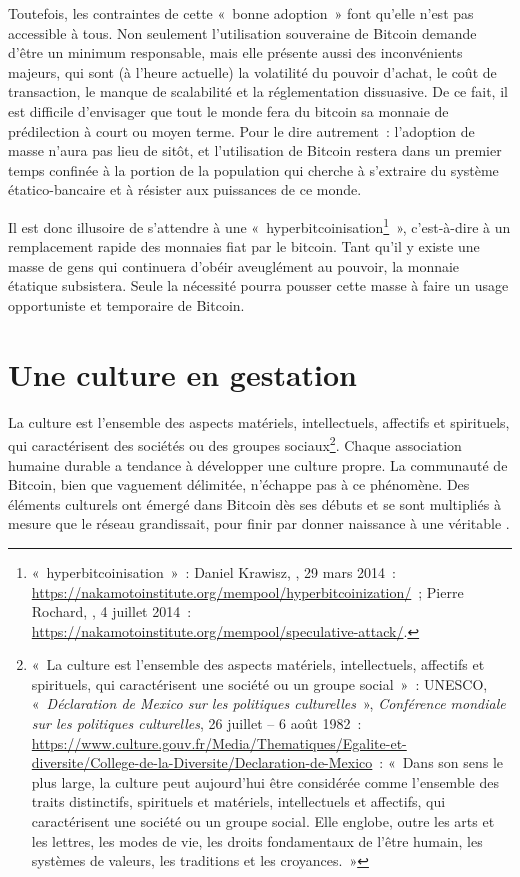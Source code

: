 Toutefois, les contraintes de cette «~bonne adoption~» font qu'elle n'est pas accessible à tous. Non seulement l'utilisation souveraine de Bitcoin demande d'être un minimum responsable, mais elle présente aussi des inconvénients majeurs, qui sont (à l'heure actuelle) la volatilité du pouvoir d'achat, le coût de transaction, le manque de scalabilité et la réglementation dissuasive. De ce fait, il est difficile d'envisager que tout le monde fera du bitcoin sa monnaie de prédilection à court ou moyen terme. Pour le dire autrement~: l'adoption de masse n'aura pas lieu de sitôt, et l'utilisation de Bitcoin restera dans un premier temps confinée à la portion de la population qui cherche à s'extraire du système étatico-bancaire et à résister aux puissances de ce monde.

Il est donc illusoire de s'attendre à une «~hyperbitcoinisation\footnote{«~hyperbitcoinisation~»~: Daniel Krawisz, , 29 mars 2014~: \url{https://nakamotoinstitute.org/mempool/hyperbitcoinization/}~; Pierre Rochard, , 4 juillet 2014~: \url{https://nakamotoinstitute.org/mempool/speculative-attack/}.}~», c'est-à-dire à un remplacement rapide des monnaies fiat par le bitcoin. Tant qu'il y existe une masse de gens qui continuera d'obéir aveuglément au pouvoir, la monnaie étatique subsistera. Seule la nécessité pourra pousser cette masse à faire un usage opportuniste et temporaire de Bitcoin.

\vspace{-1em}
\section*{Une culture en gestation}

La culture est l'ensemble des aspects matériels, intellectuels, affectifs et spirituels, qui caractérisent des sociétés ou des groupes sociaux\footnote{«~La culture est l'ensemble des aspects matériels, intellectuels, affectifs et spirituels, qui caractérisent une société ou un groupe social~»~: UNESCO, «~\emph{Déclaration de Mexico sur les politiques culturelles}~», \emph{Conférence mondiale sur les politiques culturelles}, 26 juillet -- 6 août 1982~: \url{https://www.culture.gouv.fr/Media/Thematiques/Egalite-et-diversite/College-de-la-Diversite/Declaration-de-Mexico}~: «~Dans son sens le plus large, la culture peut aujourd'hui être considérée comme l'ensemble des traits distinctifs, spirituels et matériels, intellectuels et affectifs, qui caractérisent une société ou un groupe social. Elle englobe, outre les arts et les lettres, les modes de vie, les droits fondamentaux de l'être humain, les systèmes de valeurs, les traditions et les croyances.~»}. Chaque association humaine durable a tendance à développer une culture propre. La communauté de Bitcoin, bien que vaguement délimitée, n'échappe pas à ce phénomène. Des éléments culturels ont émergé dans Bitcoin dès ses débuts et se sont multipliés à mesure que le réseau grandissait, pour finir par donner naissance à une véritable .

